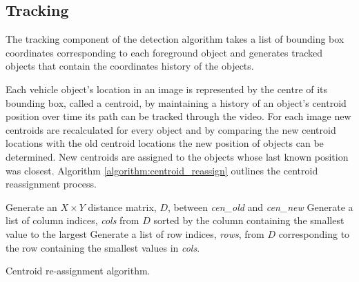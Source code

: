 \subsection{Tracking}

The tracking component of the detection algorithm takes a list of bounding box coordinates corresponding to each foreground object and generates tracked objects that contain the coordinates history of the objects. 

Each vehicle object's location in an image is represented by the centre of its bounding box, called a centroid, by maintaining a history of an object's centroid position over time its path can be tracked through the video. For each image new centroids are recalculated for every object and by comparing the new centroid locations with the old centroid locations the new position of objects can be determined. New centroids are assigned to the objects whose last known position was closest. Algorithm \ref{algorithm:centroid_reassign} outlines the centroid reassignment process.

\begin{algorithm}
  \SetAlgoLined
  Generate an $X \times Y$ distance matrix, $D$, between \emph{cen\_old} and \emph{cen\_new}\;
  Generate a list of column indices, \emph{cols} from $D$ sorted by the column containing the smallest value to the largest\;
  Generate a list of row indices, \emph{rows}, from $D$ corresponding to the row containing the smallest values in \emph{cols}.\;
  \caption{Centroid re-assignment algorithm. \cite{adrian_rosebrock_simple_object_tracking}}
  \label{algorithm:centroid_reassign}
\end{algorithm}

